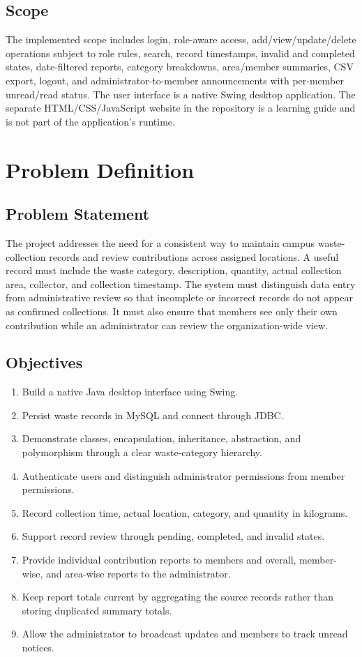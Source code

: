 \documentclass[12pt,a4paper]{report}
\begin{document}
\section{Scope}
The implemented scope includes login, role-aware access, add/view/update/delete operations subject to role rules, search, record timestamps, invalid and completed states, date-filtered reports, category breakdowns, area/member summaries, CSV export, logout, and administrator-to-member announcements with per-member unread/read status. The user interface is a native Swing desktop application. The separate HTML/CSS/JavaScript website in the repository is a learning guide and is not part of the application's runtime.

\chapter{Problem Definition}
\section{Problem Statement}
The project addresses the need for a consistent way to maintain campus waste-collection records and review contributions across assigned locations. A useful record must include the waste category, description, quantity, actual collection area, collector, and collection timestamp. The system must distinguish data entry from administrative review so that incomplete or incorrect records do not appear as confirmed collections. It must also ensure that members see only their own contribution while an administrator can review the organization-wide view.

\section{Objectives}
\begin{enumerate}[leftmargin=*]
  \item Build a native Java desktop interface using Swing.
  \item Persist waste records in MySQL and connect through JDBC.
  \item Demonstrate classes, encapsulation, inheritance, abstraction, and polymorphism through a clear waste-category hierarchy.
  \item Authenticate users and distinguish administrator permissions from member permissions.
  \item Record collection time, actual location, category, and quantity in kilograms.
  \item Support record review through pending, completed, and invalid states.
  \item Provide individual contribution reports to members and overall, member-wise, and area-wise reports to the administrator.
  \item Keep report totals current by aggregating the source records rather than storing duplicated summary totals.
  \item Allow the administrator to broadcast updates and members to track unread notices.
\end{enumerate}
\end{document}
